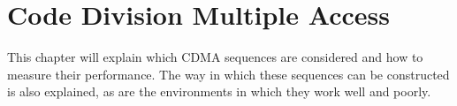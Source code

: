 
\chapter{Code Division Multiple Access}
\label{chp:cdma}


This chapter will explain which CDMA sequences are considered and how to measure their performance.
The way in which these sequences can be constructed is also explained, as are the environments in which they work well and poorly. 









